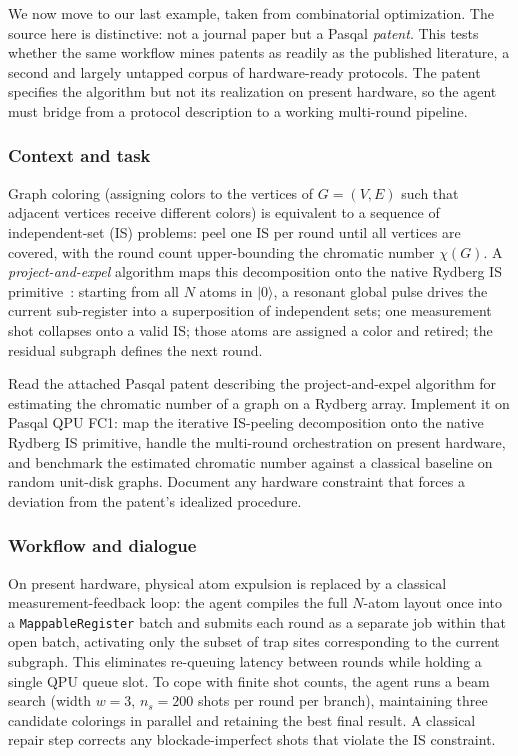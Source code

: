 \documentclass[aps,pra,reprint,amssymb,superscriptaddress,nofootinbib,floatfix]{revtex4-2}
\begin{document}
We now move to our last example, taken from combinatorial optimization. The source here is distinctive: not a journal paper but a Pasqal \emph{patent}. This
tests whether the same workflow mines patents as readily as the published literature, a second and largely untapped corpus of hardware-ready protocols. The patent specifies the algorithm but not its realization on present hardware, so the agent must bridge from a protocol description to a working multi-round pipeline.
\subsubsection{Context and task}

Graph coloring (assigning colors to the vertices of $G=(V,E)$ such that adjacent
vertices receive different colors) is equivalent to a sequence of independent-set (IS)
problems: peel one IS per round until all vertices are covered, with the round count
upper-bounding the chromatic number $\chi(G)$. A \emph{project-and-expel} algorithm maps
this decomposition onto the native Rydberg IS
primitive~\cite{henriet2026coloring,vercellino2023bbqmis}: starting from all $N$ atoms in
$|0\rangle$, a resonant global pulse drives the current sub-register into a superposition
of independent sets; one measurement shot collapses onto a valid IS; those atoms are
assigned a color and retired; the residual subgraph defines the next round.



\begin{promptbox}[title={Agent Prompt}]
Read the attached Pasqal patent describing the project-and-expel algorithm for
estimating the chromatic number of a graph on a Rydberg array. Implement it on
Pasqal QPU FC1: map the iterative IS-peeling decomposition onto the native Rydberg IS
primitive, handle the multi-round orchestration on present hardware, and benchmark the
estimated chromatic number against a classical baseline on random unit-disk graphs.
Document any hardware constraint that forces a deviation from the patent's idealized
procedure.
\end{promptbox}

\subsubsection{Workflow and dialogue}

On present hardware, physical atom expulsion is replaced by a classical
measurement-feedback loop: the agent compiles the full $N$-atom layout once into a
\texttt{MappableRegister} batch and submits each round as a separate job within that
open batch, activating only the subset of trap sites corresponding to the current
subgraph.
This eliminates re-queuing latency between rounds while holding a single QPU queue slot.
To cope with finite shot counts, the agent runs a beam search (width $w{=}3$,
$n_s{=}200$ shots per round per branch), maintaining three candidate colorings in
parallel and retaining the best final result.
A classical repair step corrects any blockade-imperfect shots that violate the IS
constraint.
\end{document}
